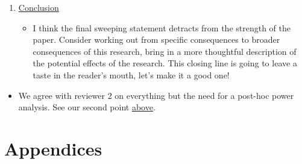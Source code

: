 \documentclass[authordate, serif, review]{jote-article}
\begin{document}
\begin{multicols}{2}
\begin{reviewend}{}
\begin{enumerate}[label=\textbf{\arabic*}), start=0]
        \item \hyperref[sec:conclusion]{Conclusion}
            \begin{itemize}
                \item I think the final sweeping statement detracts from the strength of the paper. Consider working out from specific consequences to broader consequences of this research, bring in a more thoughtful description of the potential effects of the research. This closing line is going to leave a taste in the reader's mouth, let's make it a good one!
            \end{itemize}
    \end{enumerate}
    \begin{itemize}
        \item We agree with reviewer 2 on everything but the need for a post-hoc power analysis. See our second point \hyperref[sec:reviews]{above}. 
    \end{itemize}
\end{reviewend}

\newpage
\end{multicols}
{}
{}
\section*{Appendices}
{}
\end{document}
